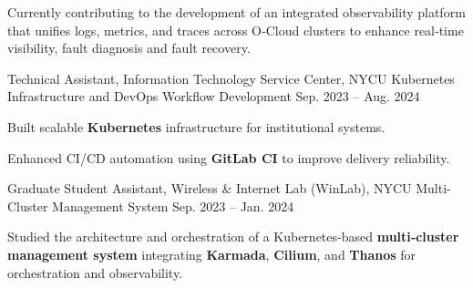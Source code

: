 \begin{cventries}
    {
      \begin{cvitems}
        \item {Currently contributing to the development of an integrated observability platform that unifies logs, metrics, and traces
across O‑Cloud clusters to enhance real‑time visibility, fault diagnosis and fault recovery.}
      \end{cvitems}
    }
  \cventry
  {Technical Assistant, Information Technology Service Center, NYCU} %
  {Kubernetes Infrastructure and DevOps Workflow Development} %
  {} %
  {Sep. 2023 -- Aug. 2024} %
  {
    \begin{cvitems}
      \item {Built scalable \textbf{Kubernetes} infrastructure for institutional systems.}
      \item {Enhanced CI/CD automation using \textbf{GitLab CI} to improve delivery reliability.}
    \end{cvitems}
  }

  
  \cventry
    {Graduate Student Assistant, Wireless \& Internet Lab (WinLab), NYCU} %
    {Multi-Cluster Management System} %
    {} %
    {Sep. 2023 -- Jan. 2024} %
    {
      \begin{cvitems}
        \item {Studied the architecture and orchestration of a Kubernetes‑based \textbf{multi‑cluster management system} integrating
\textbf{Karmada}, \textbf{Cilium}, and \textbf{Thanos} for orchestration and observability.}
      \end{cvitems}
    }

    
 
\end{cventries}
